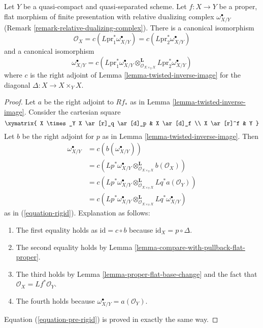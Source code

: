 \begin{lemma}[Rigidity]
\label{lemma-van-den-bergh}
Let $Y$ be a quasi-compact and quasi-separated scheme.
Let $f : X \to Y$ be a proper, flat morphism of finite presentation
with relative dualizing complex $\omega_{X/Y}^\bullet$
(Remark \ref{remark-relative-dualizing-complex}).
There is a canonical isomorphism
\begin{equation}
\label{equation-pre-rigid}
\mathcal{O}_X =
c(L\text{pr}_1^*\omega_{X/Y}^\bullet) =
c(L\text{pr}_2^*\omega_{X/Y}^\bullet)
\end{equation}
and a canonical isomorphism
\begin{equation}
\label{equation-rigid}
\omega_{X/Y}^\bullet =
c\left(L\text{pr}_1^*\omega_{X/Y}^\bullet
\otimes_{\mathcal{O}_{X \times_Y X}}^\mathbf{L}
L\text{pr}_2^*\omega_{X/Y}^\bullet\right)
\end{equation}
where $c$ is the right adjoint of
Lemma \ref{lemma-twisted-inverse-image}
for the diagonal $\Delta : X \to X \times_Y X$.
\end{lemma}

\begin{proof}
Let $a$ be the right adjoint to $Rf_*$ as in
Lemma \ref{lemma-twisted-inverse-image}.
Consider the cartesian square
$$
\xymatrix{
X \times_Y X \ar[r]_q \ar[d]_p & X \ar[d]_f \\
X \ar[r]^f & Y
}
$$
Let $b$ be the right adjoint for $p$
as in Lemma \ref{lemma-twisted-inverse-image}. Then
\begin{align*}
\omega_{X/Y}^\bullet
& =
c(b(\omega_{X/Y}^\bullet)) \\
& =
c(Lp^*\omega_{X/Y}^\bullet
\otimes_{\mathcal{O}_{X \times_Y X}}^\mathbf{L} b(\mathcal{O}_X)) \\
& =
c(Lp^*\omega_{X/Y}^\bullet
\otimes_{\mathcal{O}_{X \times_Y X}}^\mathbf{L}
Lq^*a(\mathcal{O}_Y)) \\
& =
c(Lp^*\omega_{X/Y}^\bullet
\otimes_{\mathcal{O}_{X \times_Y X}}^\mathbf{L}
Lq^*\omega_{X/Y}^\bullet)
\end{align*}
as in (\ref{equation-rigid}). Explanation as follows:
\begin{enumerate}
\item The first equality holds as $\text{id} = c \circ b$ because
$\text{id}_X = p \circ \Delta$.
\item The second equality holds by
Lemma \ref{lemma-compare-with-pullback-flat-proper}.
\item The third holds by Lemma \ref{lemma-proper-flat-base-change}
and the fact that $\mathcal{O}_X = Lf^*\mathcal{O}_Y$.
\item The fourth holds because $\omega_{X/Y}^\bullet = a(\mathcal{O}_Y)$.
\end{enumerate}
Equation (\ref{equation-pre-rigid}) is proved in exactly the same way.
\end{proof}

